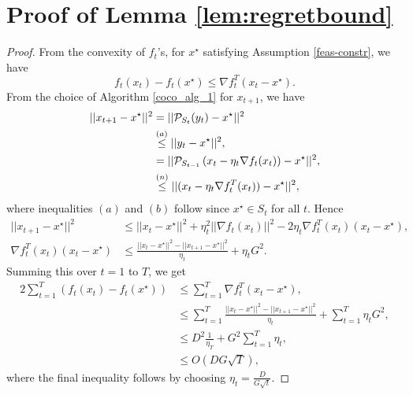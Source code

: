 \newpage
\section{Proof of Lemma \ref{lem:regretbound}}
\begin{proof}
From the convexity of $f_t$'s, for $x^\star$ satisfying Assumption \eqref{feas-constr}, we have 
$$f_t(x_t) - f_t(x^\star) \le \nabla f_t^T (x_t-x^\star).$$
From the choice of Algorithm \ref{coco_alg_1} for $x_{t+1}$, we have 
\begin{align*} ||x_{t+1}-x^\star||^2 & = || \mathcal{P}_{S_{t}}(y_t) - x^\star||^2 \\
& \stackrel{(a)}\le || y_t - x^\star||^2, \\
& = ||\mathcal{P}_{S_{t-1}}\left(x_t - \eta_t \nabla f_t(x_t)\right)-x^\star||^2, \\
& \stackrel{(n)}\le || (x_t-\eta_t\nabla f_t^T(x_t)) - x^\star||^2,
\end{align*}
where inequalities $(a)$ and $(b)$ follow since $x^\star \in S_t$ for all $t$.
Hence
\begin{align*}
 ||x_{t+1}-x^\star||^2 & \le  ||x_t-x^\star||^2 + \eta_t^2||\nabla f_t(x_t)||^2 - 2\eta_t \nabla f_t^T(x_t)(x_t-x^\star), \\
 \nabla f_t^T(x_t)(x_t-x^\star) & \le \frac{||x_t-x^\star||^2-||x_{t+1}-x^\star||^2 }{\eta_t} + \eta_t G^2.
\end{align*}
Summing this over $t=1$ to $T$, we get 
\begin{align*}
2\sum_{t=1}^T (f_t(x_t) - f_t(x^\star)) & \le \sum_{t=1}^T\nabla f_t^T (x_t-x^\star), \\
& \le \sum_{t=1}^T  \frac{||x_t-x^\star||^2-||x_{t+1}-x^\star||^2 }{\eta_t} + \sum_{t=1}^T\eta_t G^2, \\
& \le D^2 \frac{1}{\eta_T} + G^2 \sum_{t=1}^T\eta_t,\\
& \le O( DG \sqrt{T}),
\end{align*}
where the final inequality follows by choosing $\eta_t = \frac{D}{G\sqrt{t}}$.
\end{proof}